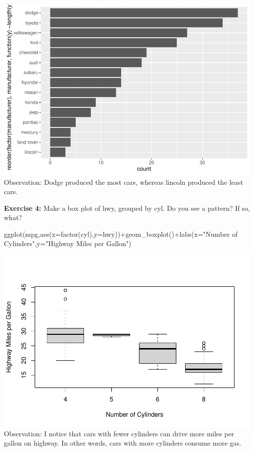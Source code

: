 \documentclass[
]{article}
\newenvironment{Shaded}{\begin{snugshade}}{\end{snugshade}}
\newcommand{\AttributeTok}[1]{\textcolor[rgb]{0.77,0.63,0.00}{#1}}
\newcommand{\FunctionTok}[1]{\textcolor[rgb]{0.00,0.00,0.00}{#1}}
\newcommand{\NormalTok}[1]{#1}
\newcommand{\SpecialCharTok}[1]{\textcolor[rgb]{0.00,0.00,0.00}{#1}}
\newcommand{\StringTok}[1]{\textcolor[rgb]{0.31,0.60,0.02}{#1}}
\begin{document}
\includegraphics{PSTAT131-HW1_files/figure-latex/unnamed-chunk-3-1.pdf}
Observation: Dodge produced the most cars, whereas lincoln produced the
least cars.

\textbf{Exercise 4:} Make a box plot of hwy, grouped by cyl. Do you see
a pattern? If so, what?

\begin{Shaded}
\begin{Highlighting}[]
\FunctionTok{ggplot}\NormalTok{(mpg,}\FunctionTok{aes}\NormalTok{(}\AttributeTok{x=}\FunctionTok{factor}\NormalTok{(cyl),}\AttributeTok{y=}\NormalTok{hwy))}\SpecialCharTok{+}\FunctionTok{geom\_boxplot}\NormalTok{()}\SpecialCharTok{+}\FunctionTok{labs}\NormalTok{(}\AttributeTok{x=}\StringTok{"Number of Cylinders"}\NormalTok{,}\AttributeTok{y=}\StringTok{"Highway Miles per Gallon"}\NormalTok{)}
\end{Highlighting}
\end{Shaded}

\includegraphics{PSTAT131-HW1_files/figure-latex/unnamed-chunk-4-1.pdf}
Observation: I notice that cars with fewer cylinders can drive more
miles per gallon on highway. In other words, cars with more cylinders
consume more gas.
\end{document}

